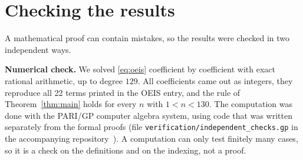 \documentclass[11pt,a4paper]{article}
\theoremstyle{definition}
\theoremstyle{remark}
\newcommand{\para}[1]{\par\medskip\noindent\textbf{#1}\enspace}
\begin{document}
\section{Checking the results}\label{sec:checks}

A mathematical proof can contain mistakes, so the results were checked in two independent ways.

\para{Numerical check.}
We solved \eqref{eq:oeis} coefficient by coefficient with exact rational arithmetic, up to degree $129$. All
coefficients came out as integers, they reproduce all 22 terms printed in the OEIS entry, and the rule of
Theorem~\ref{thm:main} holds for every $n$ with $1<n<130$.
The computation was done with the PARI/GP computer algebra system, using code that was written separately from the
formal proofs (file \texttt{verification/independent\_checks.gp} in the accompanying repository~\cite{repo}).
A computation can only test finitely many cases, so it is a check on the definitions and on the indexing, not a proof.
\end{document}
